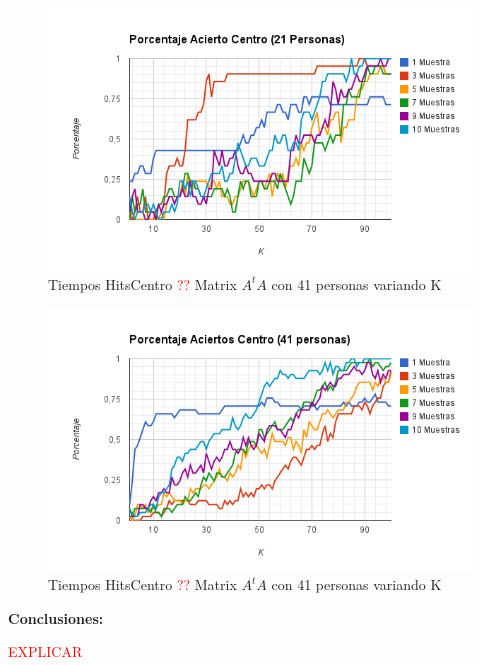 \begin{figure}[H]
\includegraphics[width=1\textwidth]{img/imagef14.png}
     \caption{Tiempos HitsCentro \textcolor{red}{??} Matrix $A^tA$ con 41 personas variando K}
     \label{fig:figura1}
\end{figure}

\begin{figure}[H]
\includegraphics[width=1\textwidth]{img/imagef15.png}
     \caption{Tiempos HitsCentro \textcolor{red}{??} Matrix $A^tA$ con 41 personas variando K}
     \label{fig:figura1}
\end{figure}


\textbf{Conclusiones:}

\textcolor{red}{EXPLICAR}
